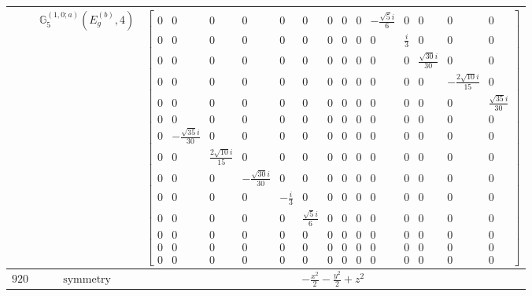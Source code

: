 \documentclass[fleqn,8pt,landscape]{jsarticle}
\begin{document}
\begin{longtable}{ccc}
$  $ & $ \mathbb{G}_{5}^{(1,0;a)}(E_{g}^{(b)},4) $ & $ \begin{bmatrix} 0 & 0 & 0 & 0 & 0 & 0 & 0 & 0 & 0 & - \frac{\sqrt{5} i}{6} & 0 & 0 & 0 & 0 \\ 0 & 0 & 0 & 0 & 0 & 0 & 0 & 0 & 0 & 0 & \frac{i}{3} & 0 & 0 & 0 \\ 0 & 0 & 0 & 0 & 0 & 0 & 0 & 0 & 0 & 0 & 0 & \frac{\sqrt{30} i}{30} & 0 & 0 \\ 0 & 0 & 0 & 0 & 0 & 0 & 0 & 0 & 0 & 0 & 0 & 0 & - \frac{2 \sqrt{10} i}{15} & 0 \\ 0 & 0 & 0 & 0 & 0 & 0 & 0 & 0 & 0 & 0 & 0 & 0 & 0 & \frac{\sqrt{35} i}{30} \\ 0 & 0 & 0 & 0 & 0 & 0 & 0 & 0 & 0 & 0 & 0 & 0 & 0 & 0 \\ 0 & - \frac{\sqrt{35} i}{30} & 0 & 0 & 0 & 0 & 0 & 0 & 0 & 0 & 0 & 0 & 0 & 0 \\ 0 & 0 & \frac{2 \sqrt{10} i}{15} & 0 & 0 & 0 & 0 & 0 & 0 & 0 & 0 & 0 & 0 & 0 \\ 0 & 0 & 0 & - \frac{\sqrt{30} i}{30} & 0 & 0 & 0 & 0 & 0 & 0 & 0 & 0 & 0 & 0 \\ 0 & 0 & 0 & 0 & - \frac{i}{3} & 0 & 0 & 0 & 0 & 0 & 0 & 0 & 0 & 0 \\ 0 & 0 & 0 & 0 & 0 & \frac{\sqrt{5} i}{6} & 0 & 0 & 0 & 0 & 0 & 0 & 0 & 0 \\ 0 & 0 & 0 & 0 & 0 & 0 & 0 & 0 & 0 & 0 & 0 & 0 & 0 & 0 \\ 0 & 0 & 0 & 0 & 0 & 0 & 0 & 0 & 0 & 0 & 0 & 0 & 0 & 0 \\ 0 & 0 & 0 & 0 & 0 & 0 & 0 & 0 & 0 & 0 & 0 & 0 & 0 & 0 \end{bmatrix} $ \\ \hline
$ 920 $ & $ \text{symmetry} $ & $ - \frac{x^{2}}{2} - \frac{y^{2}}{2} + z^{2} $ \\

\end{longtable}
\end{document}

